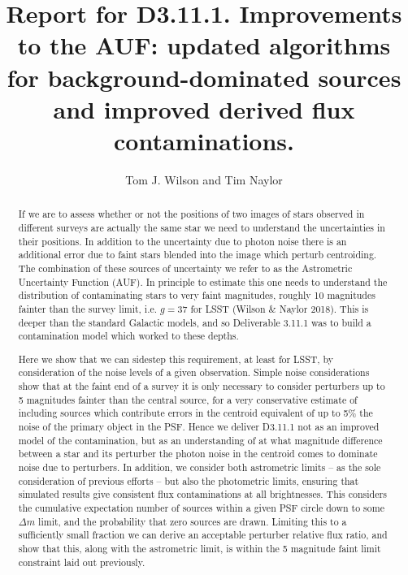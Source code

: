 \documentclass[fleqn,usenatbib]{mnras}
\title[]{Report for D3.11.1. Improvements to the AUF: updated algorithms for background-dominated sources and improved derived flux contaminations.}
\author[Tom J. Wilson and Tim Naylor]{
Tom J. Wilson
and Tim Naylor
\\
}
\date{}
\begin{document}
\label{firstpage}
\pagerange{\pageref{firstpage}--\pageref{lastpage}}
\maketitle
\begin{abstract}

If we are to assess whether or not the positions of two images of stars observed in different surveys are actually the same star we need to understand the uncertainties in their positions.
In addition to the uncertainty due to photon noise there is an additional error due to faint stars blended into the image which perturb centroiding.  The combination of these sources of uncertainty we refer to as the Astrometric Uncertainty Function (AUF).
In principle to estimate this one needs to understand the distribution of contaminating stars to very faint magnitudes, roughly 10 magnitudes fainter than the survey limit, i.e. $g=37$ for LSST (Wilson \& Naylor 2018).
This is deeper than the standard Galactic models, and so Deliverable 3.11.1 was to build a contamination model which worked to these depths.

Here we show that we can sidestep this requirement, at least for LSST, by consideration of the noise levels of a given observation.
Simple noise considerations show that at the faint end of a survey it is only necessary to consider perturbers up to 5 magnitudes fainter than the central source, for a very conservative estimate of including sources which contribute errors in the centroid equivalent of up to 5\% the noise of the primary object in the PSF.
Hence we deliver D3.11.1 not as an improved model of the contamination, but as an understanding of at what magnitude difference between a star and its perturber the photon noise in the centroid comes to dominate noise due to perturbers.
In addition, we consider both astrometric limits -- as the sole consideration of previous efforts -- but also the photometric limits, ensuring that simulated results give consistent flux contaminations at all brightnesses.
This considers the cumulative expectation number of sources within a given PSF circle down to some $\Delta m$ limit, and the probability that zero sources are drawn.
Limiting this to a sufficiently small fraction we can derive an acceptable perturber relative flux ratio, and show that this, along with the astrometric limit, is within the 5 magnitude faint limit constraint laid out previously.


\end{abstract}
\end{document}
